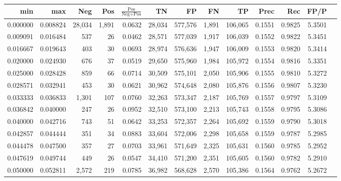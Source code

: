 \begin{tabular}{rrrrrrrrrrrrr}
\toprule
     min &      max &    Neg &   Pos & $\frac{\text{Pos}}{\text{Neg}+\text{Pos}}$ &      TN &      FP &      FN &      TP &   Prec &    Rec &   FP/P \\
\midrule
0.000000 & 0.008824 & 28,034 & 1,891 &                                     0.0632 &  28,034 & 577,576 &   1,891 & 106,065 & 0.1551 & 0.9825 & 5.3501 \\
0.009091 & 0.016484 &    537 &    26 &                                     0.0462 &  28,571 & 577,039 &   1,917 & 106,039 & 0.1552 & 0.9822 & 5.3451 \\
0.016667 & 0.019643 &    403 &    30 &                                     0.0693 &  28,974 & 576,636 &   1,947 & 106,009 & 0.1553 & 0.9820 & 5.3414 \\
0.020000 & 0.024930 &    676 &    37 &                                     0.0519 &  29,650 & 575,960 &   1,984 & 105,972 & 0.1554 & 0.9816 & 5.3351 \\
0.025000 & 0.028428 &    859 &    66 &                                     0.0714 &  30,509 & 575,101 &   2,050 & 105,906 & 0.1555 & 0.9810 & 5.3272 \\
0.028571 & 0.032941 &    453 &    30 &                                     0.0621 &  30,962 & 574,648 &   2,080 & 105,876 & 0.1556 & 0.9807 & 5.3230 \\
0.033333 & 0.036833 &  1,301 &   107 &                                     0.0760 &  32,263 & 573,347 &   2,187 & 105,769 & 0.1557 & 0.9797 & 5.3109 \\
0.036842 & 0.040000 &    247 &    26 &                                     0.0952 &  32,510 & 573,100 &   2,213 & 105,743 & 0.1558 & 0.9795 & 5.3086 \\
0.040000 & 0.042716 &    743 &    51 &                                     0.0642 &  33,253 & 572,357 &   2,264 & 105,692 & 0.1559 & 0.9790 & 5.3018 \\
0.042857 & 0.044444 &    351 &    34 &                                     0.0883 &  33,604 & 572,006 &   2,298 & 105,658 & 0.1559 & 0.9787 & 5.2985 \\
0.044478 & 0.047500 &    357 &    27 &                                     0.0703 &  33,961 & 571,649 &   2,325 & 105,631 & 0.1560 & 0.9785 & 5.2952 \\
0.047619 & 0.049744 &    449 &    26 &                                     0.0547 &  34,410 & 571,200 &   2,351 & 105,605 & 0.1560 & 0.9782 & 5.2910 \\
0.050000 & 0.052811 &  2,572 &   219 &                                     0.0785 &  36,982 & 568,628 &   2,570 & 105,386 & 0.1564 & 0.9762 & 5.2672 \\

\end{tabular}
